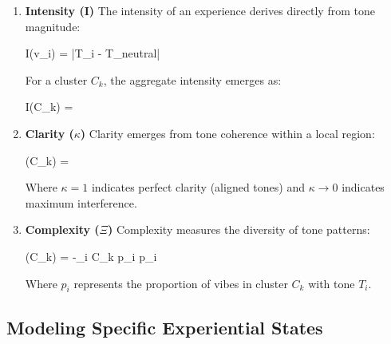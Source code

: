 \documentclass{article}
\let\oldequation\equation
\let\endoldequation\endequation
\renewenvironment{equation}{%
    \noindent\vspace{-\parskip}\vspace{-\baselineskip}%
    \oldequation
}{%
    \endoldequation
    \noindent\vspace{-\parskip}\vspace{-\baselineskip}%
}
\theoremstyle{definition}
\begin{document}
\begin{enumerate}
\item \textbf{Intensity (I)} The intensity of an experience derives directly from tone magnitude:

\begin{equation}
I(v_i) = |T_i - T_{neutral}|
\end{equation}

For a cluster $C_k$, the aggregate intensity emerges as:

\begin{equation}
I(C_k) = 
\end{equation}

\item \textbf{Clarity ($\kappa$)} Clarity emerges from tone coherence within a local region:

\begin{equation}
\kappa(C_k) = 
\end{equation}

Where $\kappa = 1$ indicates perfect clarity (aligned tones) and $\kappa \to 0$ indicates maximum interference.

\item \textbf{Complexity ($\Xi$)} Complexity measures the diversity of tone patterns:

\begin{equation}
\Xi(C_k) = -\sum_{i \in C_k} p_i \log p_i
\end{equation}

Where $p_i$ represents the proportion of vibes in cluster $C_k$ with tone $T_i$.
\end{enumerate}

\subsection{Modeling Specific Experiential States}
\end{document}
